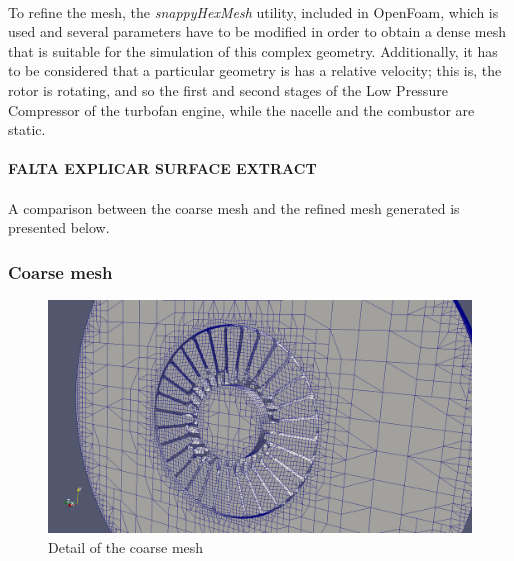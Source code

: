 \paragraph{}To refine the mesh, the \textit{snappyHexMesh} utility, included in OpenFoam, which is used and several parameters have to be modified in order to obtain a dense mesh that is suitable for the simulation of this complex geometry. Additionally, it has to be considered that a particular geometry is has a relative velocity; this is, the rotor is rotating, and so the first and second stages of the Low Pressure Compressor of the turbofan engine, while the nacelle and the combustor are static. 

\paragraph{}\textbf{FALTA EXPLICAR SURFACE EXTRACT}

\paragraph{}A comparison between the coarse mesh and the refined mesh generated is presented below.

\subsubsection{Coarse mesh}

\begin{figure}[h!]
\includegraphics[scale=0.26]{./mesh/screenshots/coarse2}
\centering
\caption{Detail of the coarse mesh}
\end{figure}


